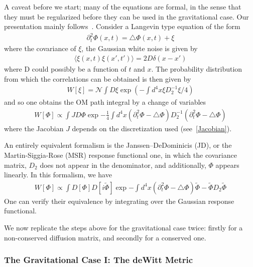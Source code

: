 \documentclass[aps,preprintnumbers,superscriptaddress,longbibliography]{revtex4-1}
\begin{document}
A caveat before we start; many of the equations are formal, in the sense that they must be regularized before they can be used in the gravitational case. Our presentation mainly follows~\cite{CriticalDynamics}.
Consider a Langevin type equation of the form
\begin{align}
    \partial_t^2\Phi(x,t)=\triangle\Phi(x,t)+\xi
\end{align}
where the covariance of $\xi$, the Gaussian white noise is given by
\begin{align}
    \langle \xi(x,t)\xi(x',t')\rangle=2D\delta(x-x')
\end{align}
where D could possibly be a function of $t$ and $x$. The probability distribution from which the correlations can be obtained is then given by 
\begin{align}
\label{eq:IntroA1}
W[\xi]=\mathcal{N}\int D\xi \exp({-\int d^4x \xi D_2^{-1}\xi/4})
\end{align}
and so one obtains the OM path integral by a change of variables
\begin{align}
\label{eq:IntroA11}
     W[\Phi]\propto\int J D\Phi \exp{-\frac{1}{4}\int d^4x (\partial_t^2\Phi-\triangle\Phi) D_2^{-1}(\partial_t^2\Phi-\triangle\Phi)}
\end{align}
where the Jacobian $J$ depends on the discretization used (see~\ref{Jacobian}).

An entirely equivalent formalism is the Janssen–DeDominicis (JD), or the Martin-Siggia-Rose (MSR) response functional one, in which the covariance matrix, $D_2$ does not appear in the denominator, and additionally, $\Phi$ appears linearly. In this formalism, we have
\begin{align}
     W[\Phi]\propto\int  D[\Phi] D[i\tilde{\Phi}] \exp{-\int d^4x (\partial_t^2\Phi-\triangle\Phi)\tilde{\Phi}-\tilde{\Phi}D_2\tilde{\Phi}}
\end{align}
One can verify their equivalence by integrating over the Gaussian response functional.

We now replicate the steps above for the gravitational case twice: firstly for a non-conserved diffusion matrix, and secondly for a conserved one.


\subsubsection{The Gravitational Case I: The deWitt Metric}
\end{document}
